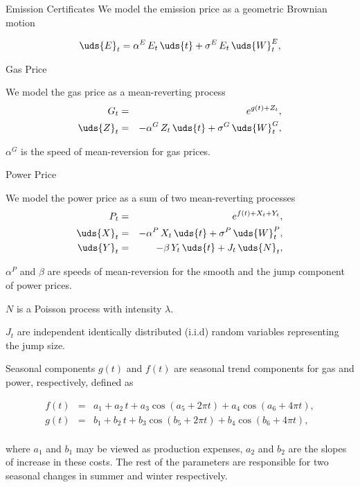 { Emission Certificates}
We model the emission price as a geometric Brownian motion

\begin{equation}
\uds{E}_t = \alpha^E\,E_t\,\uds{t} + \sigma^E\,E_t\,\uds{W}^E_t,
\label{co2}
\end{equation}

{Gas Price}
\item We model the gas price as a mean-reverting process
\begin{eqnarray}
G_t & = & e^{g(t) + Z_t},  \nonumber \\
\uds{Z}_t & = & -\alpha^G\,Z_t\,\uds{t} + \sigma^G\,\uds{W}^G_t,
\label{gas}
\end{eqnarray}
\item $\alpha^G$ is the speed of mean-reversion for gas prices.

{Power Price}
\item We model the power price as a sum of two mean-reverting processes
\begin{eqnarray}
P_t & = & e^{f(t) + X_t + Y_t},  \nonumber \\
\uds{X}_t & = & -\alpha^P\,X_t\,\uds{t} + \sigma^P\,\uds{W}^P_t, \nonumber \\
\uds{Y}_t & = & -\beta\,Y_t\,\uds{t} + J_t\,\uds{N}_t,
\label{power}
\end{eqnarray}
\item $\alpha^P$ and $\beta$ are speeds of mean-reversion for the smooth and the jump component of power prices.
\item $N$ is a Poisson process with intensity $\lambda$.
\item $J_t$ are independent identically distributed (i.i.d) random variables representing the jump size.

{Seasonal components}
$g(t)$ and $f(t)$ are seasonal trend components for gas and power, respectively, defined as

\begin{eqnarray}
f(t) &=& a_1 + a_2\,t + a_3\cos(a_5 + 2\pi t) + a_4\cos(a_6 + 4\pi t), \nonumber \\
g(t) &=& b_1 + b_2\,t + b_3\cos(b_5 + 2\pi t) + b_4\cos(b_6 + 4\pi t), \nonumber \\
\label{grseasonality}
\end{eqnarray}

where $a_1$ and $b_1$ may be viewed as production expenses, $a_2$ and $b_2$ are the slopes of increase in these costs. The rest of the parameters are responsible for two seasonal changes in summer and winter respectively.

